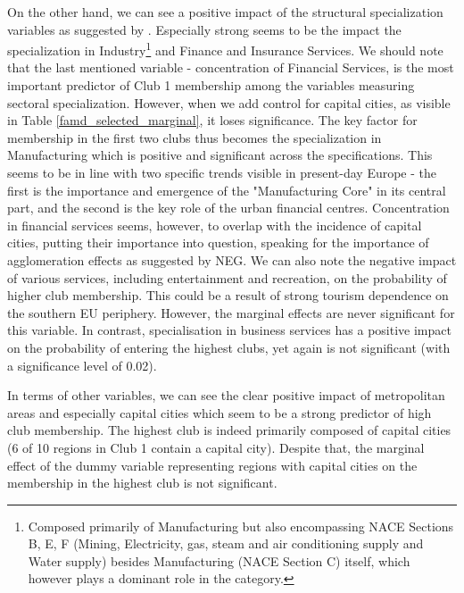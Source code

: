 \documentclass[11pt]{article}
\begin{document}
On the other hand, we can see a positive impact of the structural specialization variables as suggested by \citet{cutrini2019economic}. Especially strong seems to be the impact the specialization in Industry\footnote{Composed primarily of Manufacturing but also encompassing NACE Sections B, E, F (Mining, Electricity, gas, steam and air conditioning supply and Water supply) besides Manufacturing (NACE Section C) itself, which however plays a dominant role in the category.} and Finance and Insurance Services. We should note that the last mentioned variable - concentration of Financial Services, is the most important predictor of Club 1 membership among the variables measuring sectoral specialization. However, when we add control for capital cities, as visible in Table \ref{famd_selected_marginal}, it loses significance. The key factor for membership in the first two clubs thus becomes the specialization in Manufacturing which is positive and significant across the specifications. This seems to be in line with two specific trends visible in present-day Europe - the first is the importance and emergence of the "Manufacturing Core" in its central part, and the second is the key role of the urban financial centres. Concentration in financial services seems, however, to overlap with the incidence of capital cities, putting their importance into question, speaking for the importance of agglomeration effects as suggested by NEG.
We can also note the negative impact of various services, including entertainment and recreation, on the probability of higher club membership. This could be a result of strong tourism dependence on the southern EU periphery. However, the marginal effects are never significant for this variable. In contrast, specialisation in business services has a positive impact on the probability of entering the highest clubs, yet again is not significant (with a significance level of 0.02).

In terms of other variables, we can see the clear positive impact of metropolitan areas and especially capital cities which seem to be a strong predictor of high club membership. The highest club is indeed primarily composed of capital cities (6 of 10 regions in Club 1 contain a capital city). Despite that, the marginal effect of the dummy variable representing regions with capital cities on the membership in the highest club is not significant.
\end{document}
